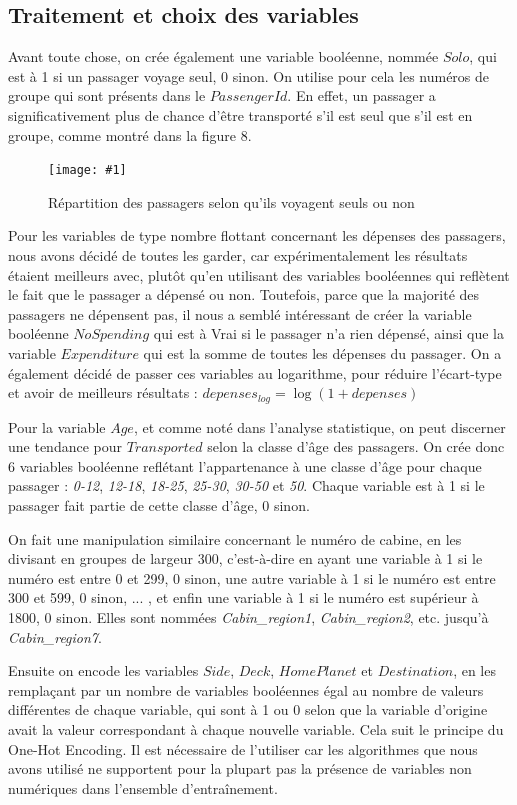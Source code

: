 \documentclass[a4paper]{article}
\newcommand{\illustration}[3]{
    \begin{figure}[h!]
        \centering
        \texttt{[image: \#1]}
        \caption{#2}
    \end{figure}
}
\begin{document}
    \subsection{Traitement et choix des variables}

    Avant toute chose, on crée également une variable booléenne, nommée $Solo$, qui est à 1 si un passager voyage seul, 0 sinon. 
    On utilise pour cela les numéros de groupe qui sont présents dans le $PassengerId$. En effet, un passager a significativement plus de chance d'être
    transporté s'il est seul que s'il est en groupe, comme montré dans la figure 8.

    \illustration{images/Figure 8.png}{Répartition des passagers selon qu'ils voyagent seuls ou non}{8cm}

    Pour les variables de type nombre flottant concernant les dépenses des passagers, nous avons décidé de toutes les garder, car expérimentalement
    les résultats étaient meilleurs avec, plutôt qu'en utilisant des variables booléennes qui reflètent le fait que le passager a dépensé ou non.
    Toutefois, parce que la majorité des passagers ne dépensent pas, il nous a semblé intéressant de créer la variable booléenne $NoSpending$
    qui est à Vrai si le passager n'a rien dépensé, ainsi que la variable $Expenditure$ qui est la somme de toutes les dépenses du passager.
    On a également décidé de passer ces variables au logarithme, pour réduire l'écart-type et avoir de meilleurs résultats : $depenses_{log} = \log{(1+depenses)}$

    Pour la variable $Age$, et comme noté dans l'analyse statistique, on peut discerner une tendance pour $Transported$ selon la classe d'âge
    des passagers. On crée donc 6 variables booléenne reflétant l'appartenance à une classe d'âge pour chaque passager : \textit{0-12}, \textit{12-18}, \textit{18-25}, 
    \textit{25-30}, \textit{30-50} et \textit{50}.
    Chaque variable est à 1 si le passager fait partie de cette classe d'âge, 0 sinon. 

    On fait une manipulation similaire concernant le numéro de cabine, en les divisant en groupes de largeur 300, c'est-à-dire en ayant une variable
    à 1 si le numéro est entre 0 et 299, 0 sinon, une autre variable à 1 si le numéro est entre 300 et 599, 0 sinon, ... , et enfin une variable à 1 si le numéro 
    est supérieur à 1800, 0 sinon. Elles sont nommées {\it Cabin\_region1}, {\it Cabin\_region2}, etc. jusqu'à {\it Cabin\_region7}.

    Ensuite on encode les variables $Side$, $Deck$, $HomePlanet$ et $Destination$, en les remplaçant par un nombre de variables booléennes égal au nombre
    de valeurs différentes de chaque variable, qui sont à 1 ou 0 selon que la variable d'origine avait la valeur correspondant à chaque nouvelle variable.
    Cela suit le principe du One-Hot Encoding. Il est nécessaire de l'utiliser car les algorithmes que nous avons utilisé ne supportent pour la plupart pas
    la présence de variables non numériques dans l'ensemble d'entraînement.
\end{document}
